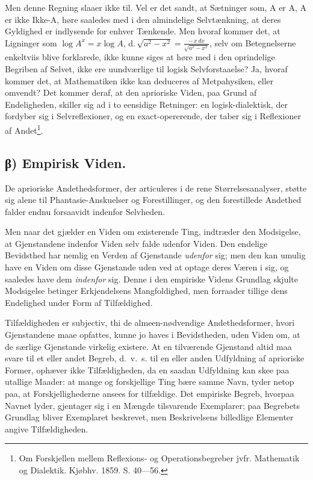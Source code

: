 \documentclass[12pt]{book}
\newcommand{\opage}[1]{\marginnote{\footnotesize\textit{[#1]}}}
\begin{document}
Men denne Regning slaaer ikke til. Vel er det sandt, at Sætninger
som, A er A, A er ikke Ikke-A, høre saaledes med i den almindelige
Selvtænkning, at deres Gyldighed er indlysende for enhver Tænkende.
Men hvoraf kommer det, at Ligninger som
$\log A^{x} = x \log A$,
d.\,$\sqrt{a^{2}-x^{2}} = \frac{-\,x\,dx}{\sqrt{a^{2}-x^{2}}}$,
selv om Betegnelserne enkeltviis blive forklarede, ikke kunne siges
at høre med i den oprindelige Begriben af Selvet, ikke ere
uundværlige til logisk Selvforstaaelse? Ja, hvoraf kommer det, at
Mathematiken ikke kan deduceres af
Metpahysiken, eller omvendt? Det kommer deraf, at den aprioriske
Viden, paa Grund af Endeligheden, skiller sig ad i to eensidige
Retninger: en logisk-dialektisk, der fordyber sig i Selvreflexioner,
og en exact-opererende, der taber sig i Reflexioner af
Andet\footnote{Om Forskjellen mellem Reflexions- og
Operationsbegreber jvfr. Mathematik og Dialektik. Kjøbhv. 1859.
S. 40---56.}.

\subsection*{β) Empirisk Viden.}

De aprioriske Andethedsformer, der articuleres i de rene
Størrelsesanalyser, støtte sig alene til Phantasie-Anskuelser og
Forestillinger, og den forestillede Andethed falder endnu forsaavidt
indenfor Selvheden.

Men naar det gjælder en Viden om existerende Ting,
\opage{11} indtræder den Modsigelse, at Gjenstandene indenfor Viden selv falde
udenfor Viden. Den endelige Bevidsthed har nemlig en Verden af
Gjenstande \emph{udenfor} sig; men den kan umulig have en Viden om
disse Gjenstande uden ved at optage deres Væren i sig, og saaledes
have dem \emph{indenfor} sig. Denne i den empiriske Videns Grundlag
skjulte Modsigelse betinger Erkjendelsens Mangfoldighed, men
forraader tillige dens Endelighed under Form af Tilfældighed.

Tilfældigheden er subjectiv, thi de almeen-nødvendige
Andethedsformer, hvori Gjenstandene maae opfattes, kunne jo haves i
Bevidstheden, uden Viden om, at de særlige Gjenstande virkelig
existere. At en tilværende Gjenstand altid maa svare til et eller
andet Begreb, d.~v.~s. til en eller anden Udfyldning af aprioriske
Former, ophæver ikke Tilfældigheden, da en saadan Udfyldning kan skee
paa utallige Maader: at mange og forskjellige Ting bære samme Navn,
tyder netop paa, at Forskjellighederne ansees for tilfældige. Det
empiriske Begreb, hvorpaa Navnet lyder, gjentager sig i en Mængde
tilsvarende Exemplarer; paa Begrebets Grundlag bliver Exemplaret
beskrevet, men Beskrivelsens billedlige Elementer angive
Tilfældigheden.
\end{document}
